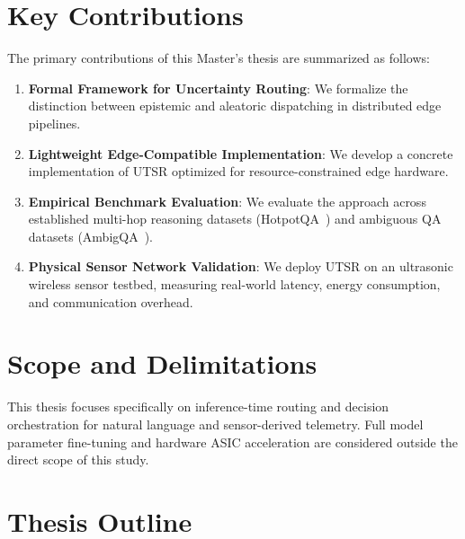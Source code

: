 \section{Key Contributions}
\label{sec:intro_contributions}

The primary contributions of this Master's thesis are summarized as follows:
\begin{enumerate}
    \item \textbf{Formal Framework for Uncertainty Routing}: We formalize the distinction between epistemic and aleatoric dispatching in distributed edge pipelines.
    \item \textbf{Lightweight Edge-Compatible Implementation}: We develop a concrete implementation of \ac{UTSR} optimized for resource-constrained edge hardware.
    \item \textbf{Empirical Benchmark Evaluation}: We evaluate the approach across established multi-hop reasoning datasets (HotpotQA~\cite{yang2018hotpotqa}) and ambiguous QA datasets (AmbigQA~\cite{min2020ambigqa}).
    \item \textbf{Physical Sensor Network Validation}: We deploy \ac{UTSR} on an ultrasonic wireless sensor testbed, measuring real-world latency, energy consumption, and communication overhead.
\end{enumerate}

\section{Scope and Delimitations}
\label{sec:intro_scope}

This thesis focuses specifically on inference-time routing and decision orchestration for natural language and sensor-derived telemetry. Full model parameter fine-tuning and hardware ASIC acceleration are considered outside the direct scope of this study.

\section{Thesis Outline}
\label{sec:intro_outline}

